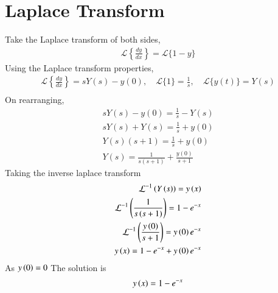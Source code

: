 \documentclass[journal,12pt,onecolumn]{IEEEtran}
\theoremstyle{remark}
\begin{document}
\section{Laplace Transform}
Take the Laplace transform of both sides,\\
\begin{align*}
    \mathcal{L}\left\{\frac{dy}{dx}\right\} = \mathcal{L}\{1 - y\}
\end{align*}
Using the Laplace transform properties,\\
\begin{align*}
    \mathcal{L}\left\{\frac{dy}{dx}\right\} = sY(s) - y(0), \quad \mathcal{L}\{1\} = \frac{1}{s}, \quad \mathcal{L}\{y(t)\} = Y(s)\\
\end{align*}
On rearranging,\\
\begin{align*}
    sY(s) - y(0) = \frac{1}{s} - Y(s)\\
    sY(s) + Y(s) = \frac{1}{s} + y(0)\\
    Y(s)(s + 1) = \frac{1}{s} + y(0)\\
    Y(s) = \frac{1}{s(s+1)} + \frac{y(0)}{s+1}
\end{align*}
Taking the inverse laplace transform \\
\begin{align*}
\mathcal{L}^{-1}\left(Y\left(s\right)\right)=y\left(x\right)\\
    \mathcal{L}^{-1}\left(\frac{1}{s\left(s+1\right)}\right)=1-e^{-x}\\
    \mathcal{L}^{-1}\left(\frac{y\left(0\right)}{s+1}\right)=y\left(0\right)e^{-x}\\
    y\left(x\right)=1-e^{-x}+y\left(0\right)e^{-x}\\
\end{align*}
As $y\left(0\right)=0$
The solution is 
\begin{align*}
    y\left(x\right)=1-e^{-x}
\end{align*}
\end{document}
